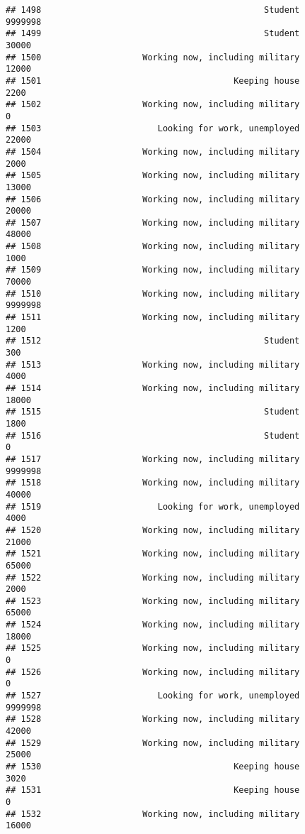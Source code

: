 \documentclass[]{book}
\theoremstyle{definition}
\theoremstyle{definition}
\theoremstyle{remark}
\begin{document}
\begin{verbatim}
## 1498                                            Student         9999998
## 1499                                            Student           30000
## 1500                    Working now, including military           12000
## 1501                                      Keeping house            2200
## 1502                    Working now, including military               0
## 1503                       Looking for work, unemployed           22000
## 1504                    Working now, including military            2000
## 1505                    Working now, including military           13000
## 1506                    Working now, including military           20000
## 1507                    Working now, including military           48000
## 1508                    Working now, including military            1000
## 1509                    Working now, including military           70000
## 1510                    Working now, including military         9999998
## 1511                    Working now, including military            1200
## 1512                                            Student             300
## 1513                    Working now, including military            4000
## 1514                    Working now, including military           18000
## 1515                                            Student            1800
## 1516                                            Student               0
## 1517                    Working now, including military         9999998
## 1518                    Working now, including military           40000
## 1519                       Looking for work, unemployed            4000
## 1520                    Working now, including military           21000
## 1521                    Working now, including military           65000
## 1522                    Working now, including military            2000
## 1523                    Working now, including military           65000
## 1524                    Working now, including military           18000
## 1525                    Working now, including military               0
## 1526                    Working now, including military               0
## 1527                       Looking for work, unemployed         9999998
## 1528                    Working now, including military           42000
## 1529                    Working now, including military           25000
## 1530                                      Keeping house            3020
## 1531                                      Keeping house               0
## 1532                    Working now, including military           16000

\end{verbatim}
\end{document}
